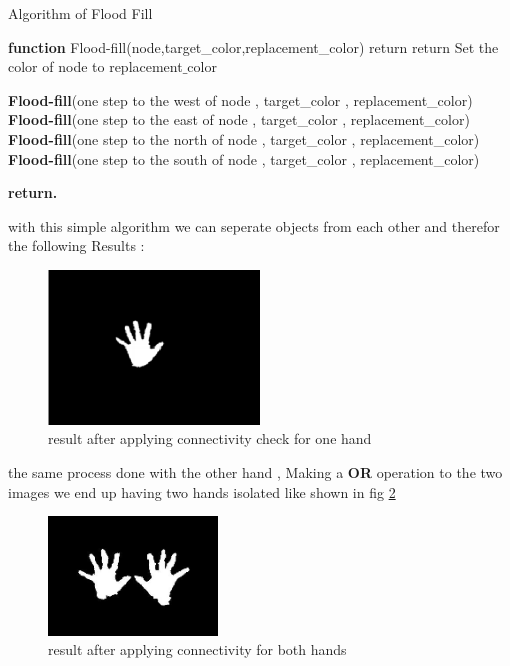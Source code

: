 \begin{algorithm}

\caption{Algorithm of Flood Fill }

\textbf{function}  Flood-fill(node,target\_color,replacement\_color) 
\newline
{}
    {
     return
    }
\newline
{}
    {
     return
    }
Set the color of node to replacement$\_$color 


\textbf{Flood-fill}(one step to the west of node , target\_color , replacement\_color)\\
\textbf{Flood-fill}(one step to the east of node , target\_color , replacement\_color)\\
\textbf{Flood-fill}(one step to the north of node , target\_color , replacement\_color)\\
\textbf{Flood-fill}(one step to the south of node , target\_color , replacement\_color)
\newline

\textbf{return.} 
\end{algorithm}
\newline

with this simple algorithm we can seperate objects from each other and therefor the following  Results : \\
 
 \begin{figure}[H]
\centering
\includegraphics[width=0.5\textwidth]{img/finalresult.png}
\caption{result after applying connectivity check for one hand  }
\label{fig:cam11}
\end{figure}


the same process done with the other hand , Making a \textbf{OR } operation to the two images we end up having two hands isolated like shown in fig \ref{fig:twohd}

 \begin{figure}[H]
\centering
\includegraphics[width=0.4\textwidth]{img/twohands.jpg}
\caption{result after applying connectivity for both hands  }
\label{fig:twohd}
\end{figure}

